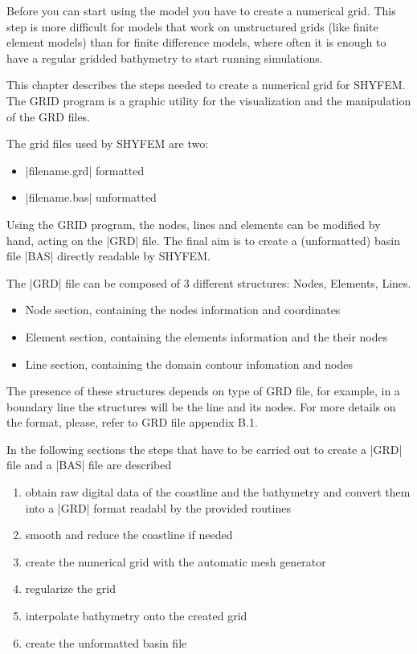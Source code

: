 
Before you can start using the model you have to create a numerical grid.
This step is more difficult for models that work on unstructured grids
(like finite element models) than for finite difference models, where
often it is enough to have a regular gridded bathymetry to start running
simulations.

This chapter describes the steps needed to create a numerical grid for SHYFEM.
The GRID program is a graphic utility for the visualization and the manipulation of the GRD files.

The grid files used by SHYFEM are two:

\begin{itemize}
\item |filename.grd| formatted
\item |filename.bas| unformatted
\end{itemize}

Using the GRID program, the nodes, lines and elements can be modified by hand, 
acting on the |GRD| file. The final aim is to create a (unformatted) basin 
file |BAS| directly readable by SHYFEM.

The |GRD| file can be composed of 3 different structures: 
Nodes, Elements, Lines.

\begin{itemize}
\item Node section, containing the nodes information and coordinates
\item Element section, containing the elements information and the their nodes
\item Line section, containing the domain contour infomation and nodes
\end{itemize}

The presence of these structures depends on type of GRD file, for example,
in a boundary line the structures will be the line and its nodes.
For more details on the format, please, refer to GRD file appendix B.1.

In the following sections the steps that have to be carried out 
to create a |GRD| file and a |BAS| file are described

\begin{enumerate}

\item obtain raw digital data of the coastline and the bathymetry and
  convert them into a |GRD| format readabl by the provided routines

\item smooth and reduce the coastline if needed

\item create the numerical grid with the automatic mesh generator

\item regularize the grid

\item interpolate bathymetry onto the created grid

\item create the unformatted basin file

\end{enumerate}

